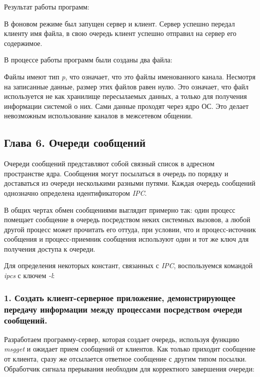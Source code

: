 \documentclass[14pt,a4paper,report]{report}
\begin{document}
Результат работы программ:



В фоновом режиме был запущен сервер и клиент. Сервер успешно передал клиенту имя файла, в свою очередь клиент успешно отправил на сервер его содержимое.

В процессе работы программ были созданы два файла:



Файлы имеют тип \emph{p}, что означает, что это файлы именованного канала. Несмотря на записанные данные, размер этих файлов равен нулю. Это означает, что файл используется не как хранилище пересылаемых данных, а только для получения информации системой о них. Сами данные проходят через ядро ОС. Это делает невозможным использование каналов в межсетевом общении.

\subsection{Глава 6. Очереди сообщений}

Очереди сообщений представляют собой связный список в адресном пространстве ядра. Сообщения могут посылаться в очередь по порядку и доставаться из очереди несколькими разными путями. Каждая очередь сообщений однозначно определена идентификатором \emph{IPC}.

В общих чертах обмен сообщениями выглядит примерно так: один процесс помещает сообщение в очередь посредством неких системных вызовов, а любой другой процесс может прочитать его оттуда, при условии, что и процесс-источник сообщения и процесс-приемник сообщения используют один и тот же ключ для получения доступа к очереди.

Для определения некоторых констант, связанных с \emph{IPC}, воспользуемся командой \emph{ipcs} с ключем \emph{-l}:



\subsubsection{1.  Создать клиент-серверное приложение, демонстрирующее передачу информации между процессами посредством очереди сообщений.}

Разработаем программу-сервер, которая создает очередь, используя функцию \emph{msgget} и ожидает прием сообщений от клиентов. Как только приходит сообщение от клиента, сразу же отсылается ответное сообщение с другим типом посылки. Обработчик сигнала прерывания необходим для корректного завершения очереди:
\end{document}
